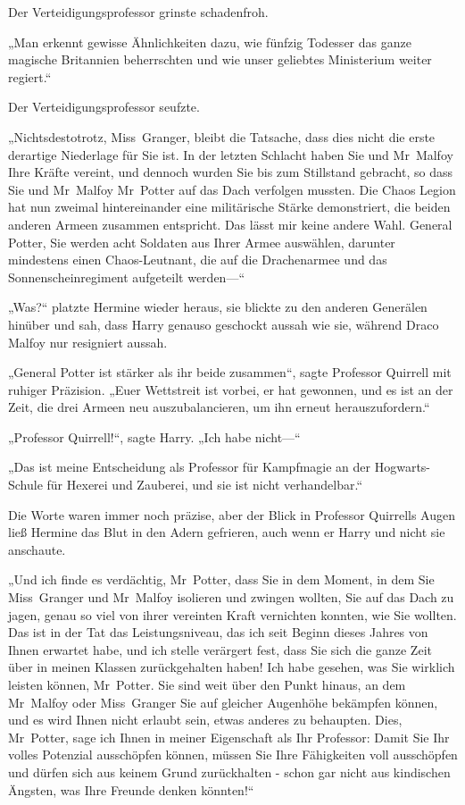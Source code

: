 {Der Verteidigungsprofessor grinste schadenfroh.

„Man erkennt gewisse Ähnlichkeiten dazu, wie fünfzig Todesser das ganze magische Britannien beherrschten und wie unser geliebtes Ministerium weiter regiert.“

Der Verteidigungsprofessor seufzte.

„Nichtsdestotrotz, Miss~Granger, bleibt die Tatsache, dass dies nicht die erste derartige Niederlage für Sie ist. In der letzten Schlacht haben Sie und Mr~Malfoy Ihre Kräfte vereint, und dennoch wurden Sie bis zum Stillstand gebracht, so dass Sie und Mr~Malfoy Mr~Potter auf das Dach verfolgen mussten. Die Chaos Legion hat nun zweimal hintereinander eine militärische Stärke demonstriert, die beiden anderen Armeen zusammen entspricht. Das lässt mir keine andere Wahl. General Potter, Sie werden acht Soldaten aus Ihrer Armee auswählen, darunter mindestens einen Chaos-Leutnant, die auf die Drachenarmee und das Sonnenscheinregiment aufgeteilt werden—“

„Was?“ platzte Hermine wieder heraus, sie blickte zu den anderen Generälen hinüber und sah, dass Harry genauso geschockt aussah wie sie, während Draco Malfoy nur resigniert aussah.

„General Potter ist stärker als ihr beide zusammen“, sagte Professor Quirrell mit ruhiger Präzision. „Euer Wettstreit ist vorbei, er hat gewonnen, und es ist an der Zeit, die drei Armeen neu auszubalancieren, um ihn erneut herauszufordern.“

„Professor Quirrell!“, sagte Harry. „Ich habe nicht—“

„Das ist meine Entscheidung als Professor für Kampfmagie an der Hogwarts-Schule für Hexerei und Zauberei, und sie ist nicht verhandelbar.“

Die Worte waren immer noch präzise, aber der Blick in Professor Quirrells Augen ließ Hermine das Blut in den Adern gefrieren, auch wenn er Harry und nicht sie anschaute.

„Und ich finde es verdächtig, Mr~Potter, dass Sie in dem Moment, in dem Sie Miss~Granger und Mr~Malfoy isolieren und zwingen wollten, Sie auf das Dach zu jagen, genau so viel von ihrer vereinten Kraft vernichten konnten, wie Sie wollten. Das ist in der Tat das Leistungsniveau, das ich seit Beginn dieses Jahres von Ihnen erwartet habe, und ich stelle verärgert fest, dass Sie sich die ganze Zeit über in meinen Klassen zurückgehalten haben! Ich habe gesehen, was Sie wirklich leisten können, Mr~Potter. Sie sind weit über den Punkt hinaus, an dem Mr~Malfoy oder Miss~Granger Sie auf gleicher Augenhöhe bekämpfen können, und es wird Ihnen nicht erlaubt sein, etwas anderes zu behaupten. Dies, Mr~Potter, sage ich Ihnen in meiner Eigenschaft als Ihr Professor: Damit Sie Ihr volles Potenzial ausschöpfen können, müssen Sie Ihre Fähigkeiten voll ausschöpfen und dürfen sich aus keinem Grund zurückhalten - schon gar nicht aus kindischen Ängsten, was Ihre Freunde denken könnten!“

}
